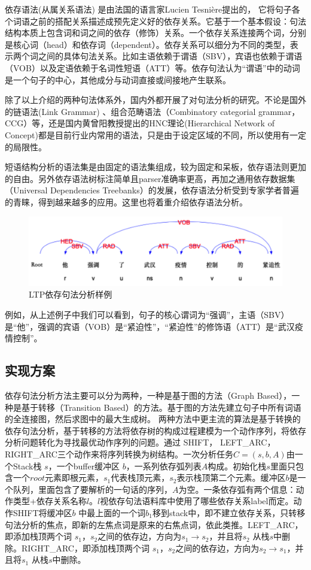 依存语法(从属关系语法) 是由法国的语言家Lucien Tesnière提出的\cite{tesniere1959elements}，
它将句子各个词语之前的搭配关系描述成预先定义好的依存关系。它基于一个基本假设：句法结构本质上包含词和词之间的依存（修饰）关系。一个依存关系连接两个词，分别是核心词（head）和依存词（dependent）。依存关系可以细分为不同的类型，表示两个词之间的具体句法关系。比如主语依赖于谓语（SBV），宾语也依赖于谓语（VOB）以及定语依赖于名词性短语（ATT）等。依存句法认为“谓语”中的动词是一个句子的中心，其他成分与动词直接或间接地产生联系。

除了以上介绍的两种句法体系外，国内外都开展了对句法分析的研究。不论是国外的链语法(Link Grammar) 、组合范畴语法（Combinatory categorial grammar，CCG）等，还是国内黄曾阳教授提出的HNC理论(Hierarchical Network of Concept)\cite{黄曾阳:12}都是目前行业内常用的语法，只是由于设定区域的不同，所以使用有一定的局限性。

短语结构分析的语法集是由固定的语法集组成，较为固定和呆板，依存语法则更加的自由。另外依存语法树标注简单且parser准确率更高，再加之通用依存数据集（Universal Dependencies Treebanks）的发展，依存语法分析受到专家学者普遍的青睐，得到越来越多的应用。这里也将着重介绍依存语法分析。

\begin{figure}[h]
\centering
\includegraphics[scale=0.3]{img/chapter_nlp/parser_example.png}
\caption{LTP依存句法分析样例}
\label{fig:parserexample}
\end{figure}
例如，从上述例子中我们可以看到，句子的核心谓词为“强调”，主语（SBV）是“他”，强调的宾语（VOB）是“紧迫性”，“紧迫性”的修饰语（ATT）是“武汉疫情控制”。


\subsection{实现方案}
依存句法分析方法主要可以分为两种，一种是基于图的方法（Graph Based），一种是基于转移（Transition Based）的方法。基于图的方法先建立句子中所有词语的全连接图，然后求图中的最大生成树。 两种方法中更主流的算法是基于转换的依存句法分析，基于转移的方法将依存树的构成过程建模为一个动作序列，将依存分析问题转化为寻找最优动作序列的问题。通过 SHIFT， LEFT\_ARC， RIGHT\_ARC三个动作来将序列转换为树结构。一次分析任务$C = (s, b, A)$由一个Stack栈 $s$，一个buffer缓冲区 $b$，一系列依存弧列表$A$构成。初始化栈$s$里面只包含一个$root$元素即根元素，$s_1$代表栈顶元素，$s_2$表示栈顶第二个元素。缓冲区$b$是一个队列，里面包含了要解析的一句话的序列，$A$为空。一条依存弧有两个信息：动作类型+依存关系名称$l$。$l$视依存句法语料库中使用了哪些依存关系label而定。动作SHIFT将缓冲区$b$ 中最上面的一个词$b_1$移到stack中，即不建立依存关系，只转移句法分析的焦点，即新的左焦点词是原来的右焦点词，依此类推。LEFT\_ARC，即添加栈顶两个词 $s_1$，$s_2$之间的依存边，方向为$s_1 \rightarrow s_2$，并且将$s_2$ 从栈$s$中删除。RIGHT\_ARC，即添加栈顶两个词 $s_1$，$s_2$之间的依存边，方向为$s_2 \rightarrow s_1$，并且将$s_1$ 从栈$s$中删除。

